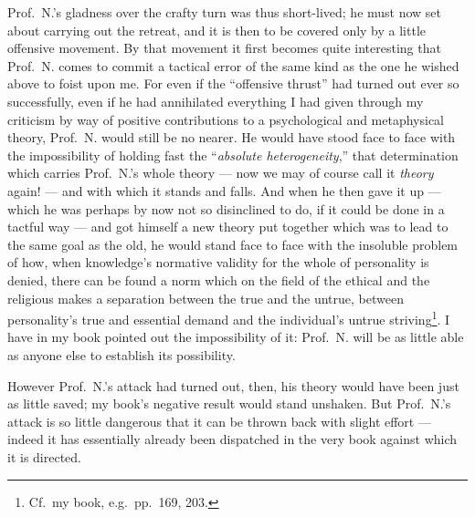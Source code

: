 \documentclass[12pt,a4paper]{book}
\begin{document}
Prof.\ N.'s gladness over the crafty turn was thus short-lived; he must now set
about carrying out the retreat, and it is then to be covered only by a little
offensive movement. By that movement it first becomes quite interesting that
Prof.\ N. comes to commit a tactical error of the same kind as the one he
wished above to foist upon me. For even if the ``offensive thrust'' had turned
out ever so successfully, even if he had annihilated everything I had given
through my criticism by way of positive contributions to a psychological and
metaphysical theory, Prof.\ N. would still be no nearer. He would have stood
face to face with the impossibility of holding fast the ``\emph{absolute
heterogeneity},'' that determination which carries Prof.\ N.'s whole theory ---
now we may of course call it \emph{theory} again! --- and with which it stands
and falls. And when he then gave it up --- which he was perhaps by now not so
disinclined to do, if it could be done in a tactful way --- and got himself a
new theory put together which was to lead to the same goal as the old, he would
stand face to face with the insoluble problem of how, when knowledge's
normative validity for the whole of personality is denied, there can be found a
norm which on the field of the ethical and the religious makes a separation
between the true and the untrue, between personality's true and essential
demand and the individual's untrue striving\footnote{%
  Cf.\ my book, e.g.\ pp.\ 169, 203.}. I have in my book pointed out the
impossibility of it: Prof.\ N. will be as little able as anyone else to
establish its possibility.

However Prof.\ N.'s attack had turned out, then, his theory would have been
just as little saved; my book's negative result would stand unshaken. But
Prof.\ N.'s attack is so little dangerous that it can be thrown back with
slight effort --- indeed it has essentially already been dispatched in the very
book against which it is directed.
\end{document}
